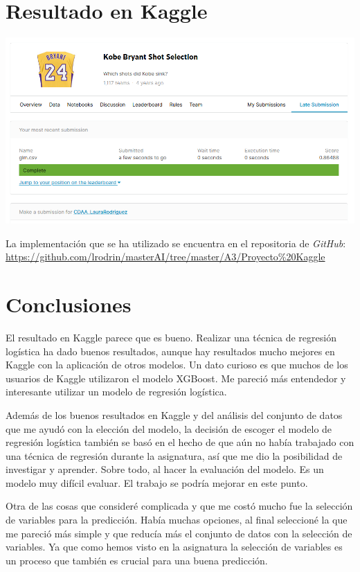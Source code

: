 \documentclass[
]{article}
\begin{document}
\hypertarget{resultado-en-kaggle}{%
\section{\texorpdfstring{\textbf{Resultado en
Kaggle}}{Resultado en Kaggle}}\label{resultado-en-kaggle}}

\includegraphics{submission.png}

La implementación que se ha utilizado se encuentra en el repositoria de
\emph{GitHub}:
\url{https://github.com/lrodrin/masterAI/tree/master/A3/Proyecto\%20Kaggle}

\hypertarget{conclusiones}{%
\section{\texorpdfstring{\textbf{Conclusiones}}{Conclusiones}}\label{conclusiones}}

El resultado en Kaggle parece que es bueno. Realizar una técnica de
regresión logística ha dado buenos resultados, aunque hay resultados
mucho mejores en Kaggle con la aplicación de otros modelos. Un dato
curioso es que muchos de los usuarios de Kaggle utilizaron el modelo
XGBoost. Me pareció más entendedor y interesante utilizar un modelo de
regresión logística.

Además de los buenos resultados en Kaggle y del análisis del conjunto de
datos que me ayudó con la elección del modelo, la decisión de escoger el
modelo de regresión logística también se basó en el hecho de que aún no
había trabajado con una técnica de regresión durante la asignatura, así
que me dio la posibilidad de investigar y aprender. Sobre todo, al hacer
la evaluación del modelo. Es un modelo muy difícil evaluar. El trabajo
se podría mejorar en este punto.

Otra de las cosas que consideré complicada y que me costó mucho fue la
selección de variables para la predicción. Había muchas opciones, al
final seleccioné la que me pareció más simple y que reducía más el
conjunto de datos con la selección de variables. Ya que como hemos visto
en la asignatura la selección de variables es un proceso que también es
crucial para una buena predicción.
\end{document}
